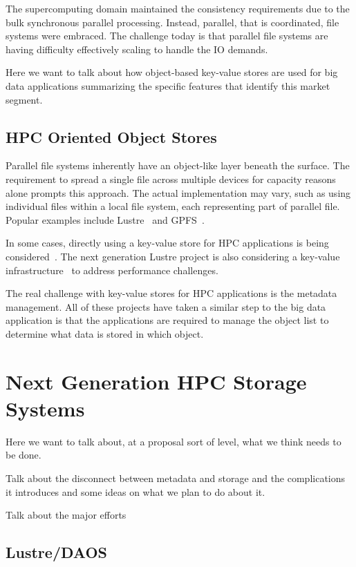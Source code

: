 The supercomputing domain maintained the consistency requirements due to the
bulk synchronous parallel processing. Instead, parallel, that is coordinated,
file systems were embraced. The challenge today is that parallel file systems
are having difficulty effectively scaling to handle the IO demands.

Here we want to talk about how object-based key-value stores are used for big
data applications summarizing the specific features that identify this market
segment.

\subsection{HPC Oriented Object Stores}

Parallel file systems inherently have an object-like layer beneath the surface.
The requirement to spread a single file across multiple devices for capacity
reasons alone prompts this approach. The actual implementation may vary, such
as using individual files within a local file system, each representing part
of parallel file. Popular examples include
Lustre~\cite{braam:2002:lustre-arch} and GPFS~\cite{schmuck:2002:gpfs}.

In some cases, directly using a key-value store for HPC applications is being
considered~\cite{yin:2014:key-value-parallel}. The next generation Lustre
project is also considering a key-value infrastructure~\cite{barton:2013:lustre}
to address performance challenges.

The real challenge with key-value stores for HPC applications is the metadata
management. All of these projects have taken a similar step to the big data
application is that the applications are required to manage the object list to
determine what data is stored in which object.

\section{Next Generation HPC Storage Systems}\label{sec:intro}

Here we want to talk about, at a proposal sort of level, what we think needs
to be done.

Talk about the disconnect between metadata and storage and the complications
it introduces and some ideas on what we plan to do about it.

Talk about the major efforts

\subsection{Lustre/DAOS}

